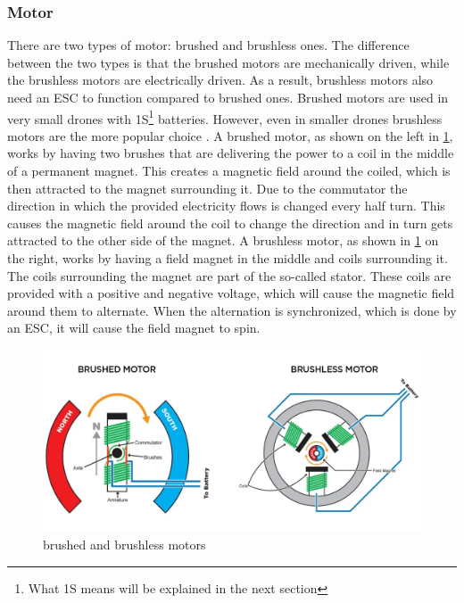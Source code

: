 \documentclass[svgnames]{article}
\begin{document}
	\subsubsection{Motor}
	There are two types of motor: brushed and brushless ones. The difference between the two types is that the brushed motors are mechanically driven, while the brushless motors are electrically driven. As a result, brushless motors also need an ESC to function compared to brushed ones. Brushed motors are used in very small drones with 1S\footnote{What 1S means will be explained in the next section} batteries. However, even in smaller drones brushless motors are the more popular choice \cite{brush/lessmotors}. A brushed motor, as shown on the left in \cref{fig:brushedbrushlessmotor}, works by having two brushes that are delivering the power to a coil in the middle of a permanent magnet. This creates a magnetic field around the coiled, which is then attracted to the magnet surrounding it. Due to the commutator the direction in which the provided electricity flows is changed every half turn. This causes the magnetic field around the coil to change the direction and in turn gets attracted to the other side of the magnet. A brushless motor, as shown in \cref{fig:brushedbrushlessmotor} on the right, works by having a field magnet in the middle and coils surrounding it. The coils surrounding the magnet are part of the so-called stator. These coils are provided with a positive and negative voltage, which will cause the magnetic field around them to alternate. When the alternation is synchronized, which is done by an \gls{ESC}, it will cause the field magnet to spin. 
\begin{figure}[ht]
	\includegraphics[width=0.9\columnwidth]{pictures/brushed_brushlessmotor}
	\caption{brushed and brushless motors \cite{brushlessedmotor}}
	\label{fig:brushedbrushlessmotor}
\end{figure}
\end{document}
